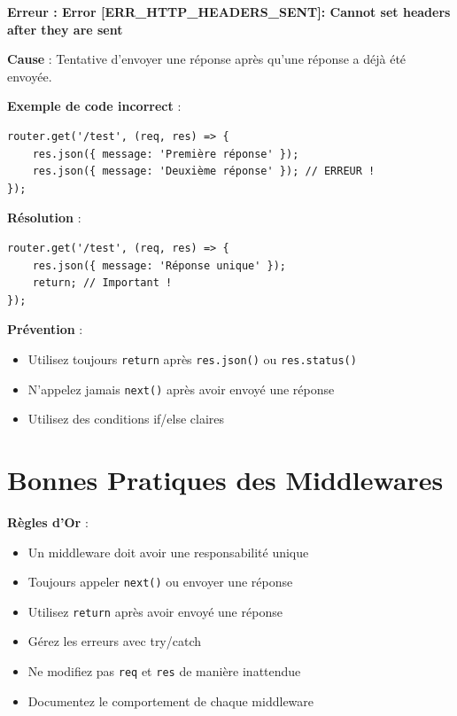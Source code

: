 \begin{errorbox}
    \textbf{Erreur : Error [ERR\_HTTP\_HEADERS\_SENT]: Cannot set headers after they are sent}
    
    \textbf{Cause} : Tentative d'envoyer une réponse après qu'une réponse a déjà été envoyée.
    
    \textbf{Exemple de code incorrect} :
    \begin{lstlisting}[style=javascript]
router.get('/test', (req, res) => {
    res.json({ message: 'Première réponse' });
    res.json({ message: 'Deuxième réponse' }); // ERREUR !
});
    \end{lstlisting}
    
    \textbf{Résolution} :
    \begin{lstlisting}[style=javascript]
router.get('/test', (req, res) => {
    res.json({ message: 'Réponse unique' });
    return; // Important !
});
    \end{lstlisting}
\end{errorbox}

\begin{bestpracticebox}
    \textbf{Prévention} :
    \begin{itemize}
        \item Utilisez toujours \texttt{return} après \texttt{res.json()} ou \texttt{res.status()}
        \item N'appelez jamais \texttt{next()} après avoir envoyé une réponse
        \item Utilisez des conditions if/else claires
    \end{itemize}
\end{bestpracticebox}

\section{Bonnes Pratiques des Middlewares}

\begin{bestpracticebox}
    \textbf{Règles d'Or} :
    \begin{itemize}
        \item Un middleware doit avoir une responsabilité unique
        \item Toujours appeler \texttt{next()} ou envoyer une réponse
        \item Utilisez \texttt{return} après avoir envoyé une réponse
        \item Gérez les erreurs avec try/catch
        \item Ne modifiez pas \texttt{req} et \texttt{res} de manière inattendue
        \item Documentez le comportement de chaque middleware
    \end{itemize}
\end{bestpracticebox}

